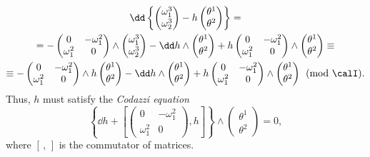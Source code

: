\begin{multline}
    \dd \left\{
        \begin{pmatrix}
            \omega_1^3\\\omega_2^3
        \end{pmatrix}
        -h 
        \begin{pmatrix}
            \theta^1\\\theta^2
        \end{pmatrix}
    \right\}=\\
    =-\begin{pmatrix}
        0&-\omega_1^2\\
        \omega_1^2& 0
    \end{pmatrix}\wedge 
    \begin{pmatrix}
        \omega_1^3\\\omega_2^3
    \end{pmatrix}
    -\dd h\wedge 
    \begin{pmatrix}
        \theta^1\\\theta^2
    \end{pmatrix}
    +h \begin{pmatrix}
        0&-\omega_1^2\\
        \omega_1^2& 0
    \end{pmatrix}\wedge 
    \begin{pmatrix}
        \theta^1\\\theta^2
    \end{pmatrix} \equiv 
    \\
    \equiv
    -\begin{pmatrix}
        0&-\omega_1^2\\
        \omega_1^2& 0
    \end{pmatrix}\wedge h
    \begin{pmatrix}
        \theta^1 \\ \theta^2
    \end{pmatrix}
    -\dd h\wedge 
    \begin{pmatrix}
        \theta^1\\\theta^2
    \end{pmatrix}
    +h \begin{pmatrix}
        0&-\omega_1^2\\
        \omega_1^2& 0
    \end{pmatrix}\wedge 
    \begin{pmatrix}
        \theta^1\\\theta^2
    \end{pmatrix}\pmod{\calI}.
\end{multline}
Thus, $h$ must satisfy the \emph{Codazzi equation} 
\[\left\{\dd h+\left[
\begin{pmatrix}
    0 & -\omega_1^2\\
    \omega_1^2 & 0
\end{pmatrix},h
\right]\right\} \wedge 
\begin{pmatrix}
    \theta^1\\\theta^2
\end{pmatrix}=0,\label{eq Gauss-Codazzi}
\]
where $[\,,\,]$ is the commutator of matrices. 

